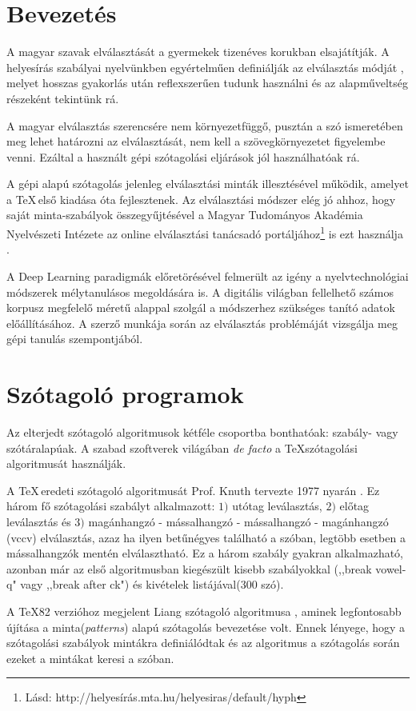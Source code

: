 \documentclass[a4paper, magyar]{article}
\begin{document}
\section{Bevezetés}
A magyar szavak elválasztását a gyermekek tizenéves korukban elsajátítják. A helyesírás szabályai nyelvünkben egyértelműen definiálják az elválasztás módját \cite{akademia1959magyar}, melyet hosszas gyakorlás után reflexszerűen tudunk használni és az alapműveltség részeként tekintünk rá.

A magyar elválasztás szerencsére nem környezetfüggő, pusztán a szó ismeretében meg lehet határozni az elválasztását, nem kell a szövegkörnyezetet figyelembe venni. Ezáltal a használt gépi szótagolási eljárások jól használhatóak rá.

A gépi alapú szótagolás jelenleg elválasztási minták illesztésével működik, amelyet a \TeX\,első kiadása óta fejlesztenek. Az elválasztási módszer elég jó ahhoz, hogy saját minta-szabályok összegyűjtésével a Magyar Tudományos Akadémia Nyelvészeti Intézete az online elválasztási tanácsadó portáljához\footnote{Lásd: http://helyesírás.mta.hu/helyesiras/default/hyph} is ezt használja \cite{mihaltz2013helyesiras}.

A Deep Learning paradigmák előretörésével felmerült az igény a nyelvtechnológiai módszerek mélytanulásos megoldására is. A digitális világban fellelhető számos korpusz megfelelő méretű alappal szolgál a módszerhez szükséges tanító adatok előállításához. A szerző munkája során az elválasztás problémáját vizsgálja meg gépi tanulás szempontjából.
\section{Szótagoló programok}
Az elterjedt szótagoló algoritmusok kétféle csoportba bonthatóak: szabály- vagy szótáralapúak. A szabad szoftverek világában \textit{de facto} a \TeX szótagolási algoritmusát használják.

A \TeX\,eredeti szótagoló algoritmusát Prof. Knuth tervezte 1977 nyarán \cite{knuth1979tex}. Ez három fő szótagolási szabályt alkalmazott: $1)$ utótag leválasztás, $2)$ előtag leválasztás és $3)$ magánhangzó - mássalhangzó - mássalhangzó - magánhangzó (vccv) elválasztás, azaz ha ilyen betűnégyes található a szóban, legtöbb esetben a mássalhangzók mentén elválasztható. Ez a három szabály gyakran alkalmazható, azonban már az első algoritmusban kiegészült kisebb szabályokkal (,,break vowel-q" vagy ,,break after ck") és kivételek listájával(300 szó).

A \TeX82 verzióhoz megjelent Liang szótagoló algoritmusa \cite{liang1983word}, aminek legfontosabb újítása a minta(\textit{patterns}) alapú szótagolás bevezetése volt. Ennek lényege, hogy a szótagolási szabályok mintákra definiálódtak és az algoritmus a szótagolás során ezeket a mintákat keresi a szóban.
\end{document}
